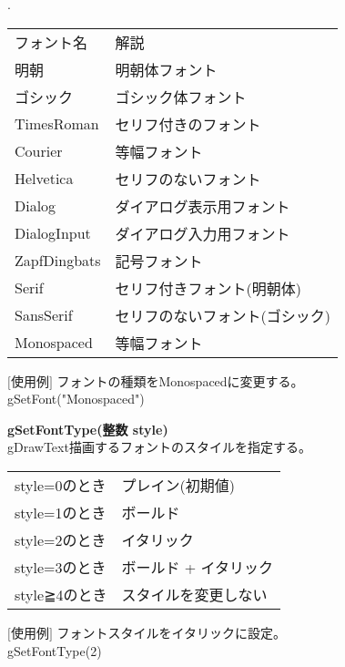 \documentclass[11pt,a4j]{jarticle}
\newcounter{enum2}
\newenvironment{enumerate2}{%
   \begin{list}%
   {%
      \arabic{enum2}.\ \,%
   }%
   {%
      \usecounter{enum2}
      \setlength{\itemindent}{0zw}%
      \setlength{\leftmargin}{3zw}%
      \setlength{\rightmargin}{0zw}%
      \setlength{\labelsep}{0zw}%
      \setlength{\labelwidth}{3zw}%
      \setlength{\itemsep}{0em}%
      \setlength{\parsep}{0em}%
      \setlength{\listparindent}{0zw}%
   }
}{%
   \end{list}%
}
\begin{document}
\begin{enumerate2}
      \begin{table}[!h]
      \begin{center}
      {\small{
      \begin{tabular}{l l}
	    フォント名 &      解説 \\
	    明朝       &   明朝体フォント \\
	    ゴシック   &   ゴシック体フォント \\
	    TimesRoman &   セリフ付きのフォント \\
	    Courier    &   等幅フォント \\
	    Helvetica  &   セリフのないフォント \\
	    Dialog     &   ダイアログ表示用フォント \\ 
	    DialogInput &   ダイアログ入力用フォント \\
	    ZapfDingbats & 記号フォント \\
	    Serif        & セリフ付きフォント(明朝体) \\
	    SansSerif    & セリフのないフォント(ゴシック) \\
	    Monospaced   & 等幅フォント \\
      \end{tabular}
      }}
      \end{center}
      \end{table}
         \vspace{-5mm}
	 \hspace{10pt}  $[$使用例$]$  フォントの種類をMonospacedに変更する。 \\
         \hspace{55pt}     gSetFont("Monospaced") \\

\item {\bf{gSetFontType(整数 style)}} \\
       gDrawText描画するフォントのスタイルを指定する。

      \begin{table}[!h]
      \begin{center}
      {\small{
      \begin{tabular}{l l}
       style=0のとき & プレイン(初期値) \\
       style=1のとき & ボールド \\
       style=2のとき & イタリック \\
       style=3のとき & ボールド + イタリック \\
       style≧4のとき & スタイルを変更しない \\
      \end{tabular}
      }}
      \end{center}
      \end{table}
         \vspace{-5mm}
	 \hspace{10pt}  $[$使用例$]$ フォントスタイルをイタリックに設定。 \\
         \hspace{55pt}     gSetFontType(2) \\


\end{enumerate2}
\end{document}
